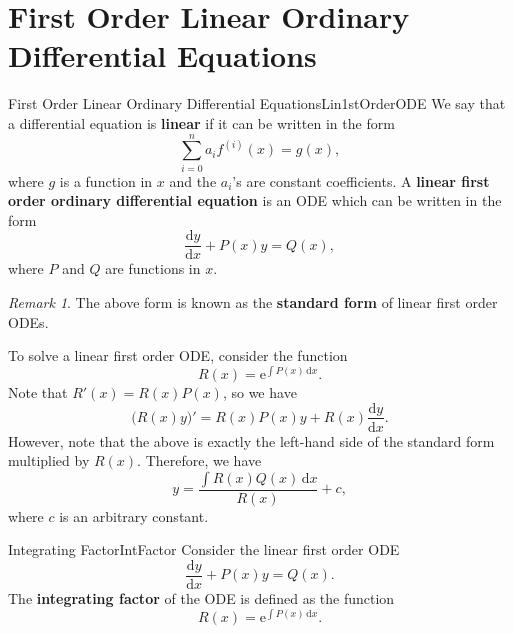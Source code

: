 \documentclass[math, code]{amznotes}
\theoremstyle{remark}
\newtheorem*{remark}{Remark}
\newcommand{\e}{\mathrm{e}}
\renewcommand{\d}{\mathrm{d}}
\begin{document}
\section{First Order Linear Ordinary Differential Equations}
\begin{dfnbox}{First Order Linear Ordinary Differential Equations}{Lin1stOrderODE}
    We say that a differential equation is {\color{red} \textbf{linear}} if it can be written in the form 
    \begin{equation*}
        \sum_{i = 0}^{n}a_if^{(i)}(x) = g(x),
    \end{equation*}
    where $g$ is a function in $x$ and the $a_i$'s are constant coefficients. A {\color{red} \textbf{linear first order ordinary differential equation}} is an ODE which can be written in the form
    \begin{equation*}
        \frac{\d y}{\d x} + P(x)y = Q(x),
    \end{equation*}
    where $P$ and $Q$ are functions in $x$.
\end{dfnbox}
\begin{notebox}
    \begin{remark}
        The above form is known as the {\color{red} \textbf{standard form}} of linear first order ODEs.
    \end{remark}
\end{notebox}
To solve a linear first order ODE, consider the function 
\begin{equation*}
    R(x) = \e^{\int\!P(x)\,\d x}.
\end{equation*}
Note that $R'(x) = R(x)P(x)$, so we have 
\begin{equation*}
    \bigl(R(x)y\bigr)' = R(x)P(x)y + R(x)\frac{\d y}{\d x}.
\end{equation*}
However, note that the above is exactly the left-hand side of the standard form multiplied by $R(x)$. Therefore, we have 
\begin{equation*}
    y = \frac{\int\!R(x)Q(x)\,\d x}{R(x)} + c,
\end{equation*}
where $c$ is an arbitrary constant.
\begin{dfnbox}{Integrating Factor}{IntFactor}
    Consider the linear first order ODE 
    \begin{equation*}
        \frac{\d y}{\d x} + P(x)y = Q(x).
    \end{equation*}
    The {\color{red} \textbf{integrating factor}} of the ODE is defined as the function 
    \begin{equation*}
        R(x) = \e^{\int\!P(x)\,\d x}.
    \end{equation*}
\end{dfnbox}
\end{document}
